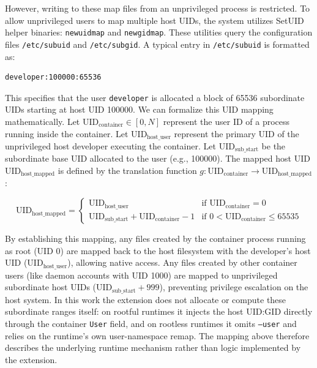 However, writing to these map files from an unprivileged process is restricted. To allow unprivileged users to map multiple host UIDs, the system utilizes SetUID helper binaries: \texttt{newuidmap} and \texttt{newgidmap}. These utilities query the configuration files \texttt{/etc/subuid} and \texttt{/etc/subgid}.
A typical entry in \texttt{/etc/subuid} is formatted as:
\begin{verbatim}
developer:100000:65536
\end{verbatim}
This specifies that the user \texttt{developer} is allocated a block of 65536 subordinate UIDs starting at host UID 100000.
We can formalize this UID mapping mathematically. Let $\mathrm{UID}_{\text{container}} \in [0, N]$ represent the user ID of a process running inside the container. Let $\mathrm{UID}_{\text{host\_user}}$ represent the primary UID of the unprivileged host developer executing the container. Let $\mathrm{UID}_{\text{sub\_start}}$ be the subordinate base UID allocated to the user (e.g., 100000). The mapped host UID $\mathrm{UID}_{\text{host\_mapped}}$ is defined by the translation function $g: \mathrm{UID}_{\text{container}} \to \mathrm{UID}_{\text{host\_mapped}}$:

\begin{equation}
\mathrm{UID}_{\text{host\_mapped}} = \begin{cases}
\mathrm{UID}_{\text{host\_user}} & \text{if } \mathrm{UID}_{\text{container}} = 0 \\
\mathrm{UID}_{\text{sub\_start}} + \mathrm{UID}_{\text{container}} - 1 & \text{if } 0 < \mathrm{UID}_{\text{container}} \le 65535
\end{cases}
\end{equation}

By establishing this mapping, any files created by the container process running as root (UID 0) are mapped back to the host filesystem with the developer's host UID ($\mathrm{UID}_{\text{host\_user}}$), allowing native access. Any files created by other container users (like daemon accounts with UID 1000) are mapped to unprivileged subordinate host UIDs ($\mathrm{UID}_{\text{sub\_start}} + 999$), preventing privilege escalation on the host system. In this work the extension does not allocate or compute these subordinate ranges itself: on rootful runtimes it injects the host UID:GID directly through the container \texttt{User} field, and on rootless runtimes it omits \texttt{--user} and relies on the runtime's own user-namespace remap. The mapping above therefore describes the underlying runtime mechanism rather than logic implemented by the extension.

